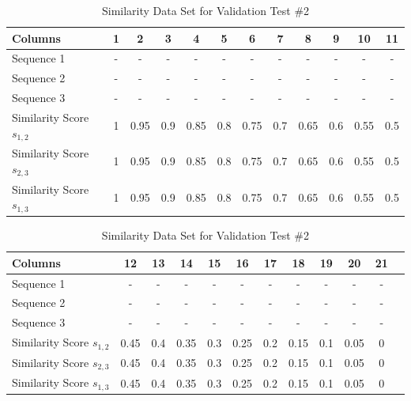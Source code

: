 \begin{table}[htb]
\caption{Similarity Data Set for Validation Test \#2}\label{tab:test_2}\centering\small
\begin{tabular}{lccccccccccc} \toprule
  Columns                     & 1   & 2    & 3   & 4    & 5   & 6    & 7   & 8    & 9   & 10   & 11  \\ \hline
  Sequence 1                  & -   & -    & -   & -    & -   & -    & -   & -    & -   & -    & -   \\
  Sequence 2                  & -   & -    & -   & -    & -   & -    & -   & -    & -   & -    & -   \\
  Sequence 3                  & -   & -    & -   & -    & -   & -    & -   & -    & -   & -    & -   \\
  Similarity Score $s_{1,2}$  & 1   & 0.95 & 0.9 & 0.85 & 0.8 & 0.75 & 0.7 & 0.65 & 0.6 & 0.55 & 0.5 \\
  Similarity Score $s_{2,3}$  & 1   & 0.95 & 0.9 & 0.85 & 0.8 & 0.75 & 0.7 & 0.65 & 0.6 & 0.55 & 0.5 \\
  Similarity Score $s_{1,3}$  & 1   & 0.95 & 0.9 & 0.85 & 0.8 & 0.75 & 0.7 & 0.65 & 0.6 & 0.55 & 0.5 \\ \bottomrule
\end{tabular}\vspace{4mm}
\begin{tabular}{lccccccccccc} \toprule
  Columns                     & 12   & 13  & 14   & 15  & 16   & 17  & 18   & 19  & 20   & 21 \\ \hline
  Sequence 1                  & -    & -   & -    & -   & -    & -   & -    & -   & -    & -  \\
  Sequence 2                  & -    & -   & -    & -   & -    & -   & -    & -   & -    & -  \\
  Sequence 3                  & -    & -   & -    & -   & -    & -   & -    & -   & -    & -  \\
  Similarity Score $s_{1,2}$  & 0.45 & 0.4 & 0.35 & 0.3 & 0.25 & 0.2 & 0.15 & 0.1 & 0.05 & 0  \\
  Similarity Score $s_{2,3}$  & 0.45 & 0.4 & 0.35 & 0.3 & 0.25 & 0.2 & 0.15 & 0.1 & 0.05 & 0  \\
  Similarity Score $s_{1,3}$  & 0.45 & 0.4 & 0.35 & 0.3 & 0.25 & 0.2 & 0.15 & 0.1 & 0.05 & 0  \\ \bottomrule
\end{tabular}
\end{table}

